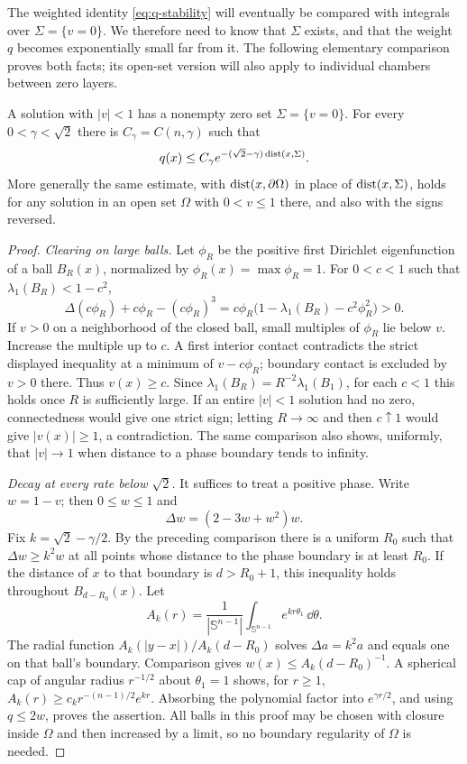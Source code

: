 The weighted identity \eqref{eq:q-stability} will eventually be compared
with integrals over $\Sigma=\{v=0\}$. We therefore need to know that
$\Sigma$ exists, and that the weight $q$ becomes exponentially small
far from it. The following elementary comparison proves both facts;
its open-set version will also apply to individual chambers between
zero layers.

\begin{lemma}\label{lem:diffuse-phase}
A solution with $|v|<1$ has a nonempty zero set $\Sigma=\{v=0\}$.
For every $0<\gamma<\sqrt2$ there is $C_\gamma=C(n,\gamma)$ such that
\begin{equation}\label{eq:phase-decay}
 q(x)\le C_\gamma
       e^{-(\sqrt2-\gamma)\operatorname{dist}(x,\Sigma)}.
\end{equation}
More generally the same estimate, with $\operatorname{dist}(x,\partial\Omega)$ in
place of $\operatorname{dist}(x,\Sigma)$, holds for any solution in an open set
$\Omega$ with $0<v\le1$ there, and also with the signs reversed.
\end{lemma}

\begin{proof}
\emph{Clearing on large balls.}
Let $\phi_R$ be the positive first Dirichlet eigenfunction of a ball
$B_R(x)$, normalized by $\phi_R(x)=\max\phi_R=1$. For
$0<c<1$ such that $\lambda_1(B_R)<1-c^2$,
\[
 \Delta(c\phi_R)+c\phi_R-(c\phi_R)^3
 =c\phi_R\big(1-\lambda_1(B_R)-c^2\phi_R^2\big)>0.
\]
If $v>0$ on a neighborhood of the closed ball, small multiples of
$\phi_R$ lie below $v$. Increase the multiple up to $c$. A first
interior contact contradicts the strict displayed inequality at a
minimum of $v-c\phi_R$; boundary contact is excluded by $v>0$ there.
Thus $v(x)\ge c$. Since $\lambda_1(B_R)=R^{-2}\lambda_1(B_1)$,
for each $c<1$ this holds once $R$ is sufficiently large. If an entire
$|v|<1$ solution had no zero, connectedness would give one strict sign;
letting $R\to\infty$ and then $c\uparrow1$ would give $|v(x)|\ge1$,
a contradiction. The same comparison also shows, uniformly,
that $|v|\to1$ when distance to a phase boundary tends to infinity.

\emph{Decay at every rate below $\sqrt2$.}
It suffices to treat a positive phase. Write $w=1-v$;
then $0\le w\le1$ and
\[
 \Delta w=(2-3w+w^2)w.
\]
Fix $k=\sqrt2-\gamma/2$. By the preceding comparison there is a
uniform $R_0$ such that $\Delta w\ge k^2w$ at all points whose distance
to the phase boundary is at least $R_0$. If the distance of $x$ to that
boundary is $d>R_0+1$, this inequality holds throughout $B_{d-R_0}(x)$.
Let
\[
 A_k(r)=\frac1{|\mathbb S^{n-1}|}
             \int_{\mathbb S^{n-1}}e^{kr\theta_1}\,\dd\theta.
\]
The radial function $A_k(|y-x|)/A_k(d-R_0)$ solves
$\Delta a=k^2a$ and equals one on that ball's boundary. Comparison
gives $w(x)\le A_k(d-R_0)^{-1}$. A spherical cap of angular radius
$r^{-1/2}$ about $\theta_1=1$ shows, for $r\ge1$,
$A_k(r)\ge c_k r^{-(n-1)/2}e^{kr}$. Absorbing the polynomial factor
into $e^{\gamma r/2}$, and using $q\le2w$, proves the assertion.
All balls in this proof may be chosen with closure inside $\Omega$ and
then increased by a limit, so no boundary regularity of $\Omega$ is needed.
\end{proof}

